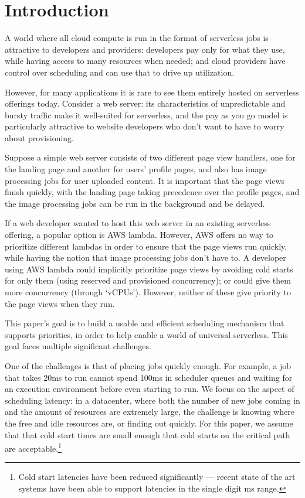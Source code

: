 \section{Introduction}

A world where all cloud compute is run in the format of serverless jobs is
attractive to developers and providers: developers pay only for what they use,
while having access to many resources when needed; and cloud providers have
control over scheduling and can use that to drive up utilization.


However, for many applications it is rare to see them entirely hosted on
serverless offerings today\cite{TODO}. Consider a web server: its
characteristics of unpredictable and bursty traffic make it well-suited for
serverless, and the pay as you go model is particularly attractive to website
developers who don't want to have to worry about provisioning.

Suppose a simple web server consists of two different page view handlers, one
for the landing page and another for users' profile pages, and also has image
processing jobs for user uploaded content. It is important that the page views
finish quickly, with the landing page taking precedence over the profile pages,
and the image processing jobs can be run in the background and be delayed.

If a web developer wanted to host this web server in an existing serverless
offering, a popular option is AWS lambda\cite{TODO}. However, AWS offers no way
to prioritize different lambdas in order to ensure that the page views run
quickly, while having the notion that image processing jobs don't have to. A
developer using AWS lambda could implicitly prioritize page views by avoiding
cold starts for only them (using reserved and provisioned
concurrency\cite{TODO}); or could give them more concurrency (through
`vCPUs'\cite{TODO}). However, neither of these give priority to the page views
when they run.

This paper's goal is to build a usable and efficient scheduling mechanism that
supports priorities, in order to help enable a world of universal serverless.
This goal faces multiple significant challenges.

One of the challenges is that of placing jobs quickly enough. For example, a job
that takes 20ms to run cannot spend 100ms in scheduler queues and waiting for an
execution environment before even starting to run. We focus on the aspect of
scheduling latency: in a datacenter, where both the number of new jobs coming in
and the amount of resources are extremely large, the challenge is knowing where
the free and idle resources are, or finding out quickly. For this paper, we
assume that that cold start times are small enough that cold starts on the
critical path are acceptable.\footnote{Cold start latencies have been reduced
significantly --- recent state of the art systems have been able to support
latencies in the single digit ms range\cite{TODO}.}

